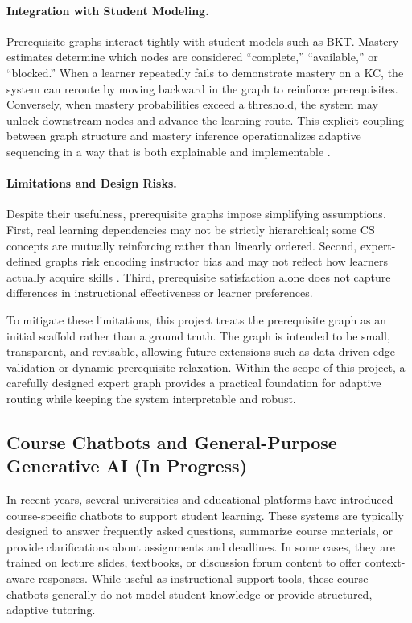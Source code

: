 \documentclass{article}
\begin{document}
\paragraph{Integration with Student Modeling.}
Prerequisite graphs interact tightly with student models such as BKT. Mastery
estimates determine which nodes are considered ``complete,'' ``available,'' or
``blocked.'' When a learner repeatedly fails to demonstrate mastery on a KC, the
system can reroute by moving backward in the graph to reinforce prerequisites.
Conversely, when mastery probabilities exceed a threshold, the system may unlock
downstream nodes and advance the learning route. This explicit coupling between
graph structure and mastery inference operationalizes adaptive sequencing in a
way that is both explainable and implementable \cite{corbett1995,koedinger2012}.

\paragraph{Limitations and Design Risks.}
Despite their usefulness, prerequisite graphs impose simplifying assumptions.
First, real learning dependencies may not be strictly hierarchical; some CS
concepts are mutually reinforcing rather than linearly ordered. Second, expert-
defined graphs risk encoding instructor bias and may not reflect how learners
actually acquire skills \cite{koedinger2012}. Third, prerequisite satisfaction
alone does not capture differences in instructional effectiveness or learner
preferences.

To mitigate these limitations, this project treats the prerequisite graph as an
initial scaffold rather than a ground truth. The graph is intended to be small,
transparent, and revisable, allowing future extensions such as data-driven edge
validation or dynamic prerequisite relaxation. Within the scope of this project,
a carefully designed expert graph provides a practical foundation for adaptive
routing while keeping the system interpretable and robust.


\subsection{Course Chatbots and General-Purpose Generative AI (In Progress)}

In recent years, several universities and educational platforms have introduced
course-specific chatbots to support student learning. These systems are typically
designed to answer frequently asked questions, summarize course materials, or
provide clarifications about assignments and deadlines. In some cases, they are
trained on lecture slides, textbooks, or discussion forum content to offer
context-aware responses. While useful as instructional support tools, these
course chatbots generally do not model student knowledge or provide structured,
adaptive tutoring.
\end{document}
